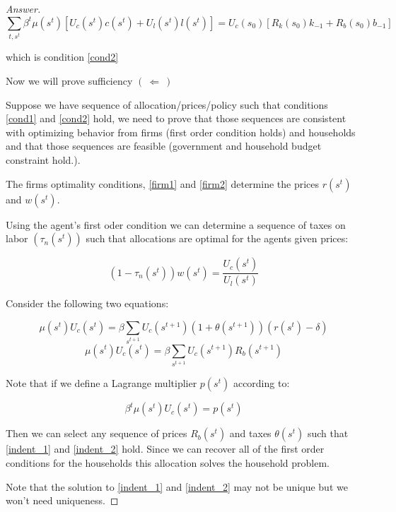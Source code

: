 \documentclass[12pt]{article}
\theoremstyle{definition}
\begin{document}
\begin{proof}[Answer]
$$
\sum_{ {t},  {s}^{ {t}}} \beta^{ {t}} \mu\left( {s}^{ {t}}\right)\left[ {U}_{ {c}}\left( {s}^{ {t}}\right)  {c}\left( {s}^{ {t}}\right)+ {U}_{ {l}}\left( {s}^{ {t}}\right)  {l}\left( {s}^{ {t}}\right)\right]= {U}_{ {c}}\left( {s}_{0}\right)\left[ {R}_{ {k}}\left( {s}_{0}\right)  {k}_{-1}+ {R}_{ {b}}\left( {s}_{0}\right)  {b}_{-1}\right]
$$

which is condition \eqref{cond2} 

Now we will prove sufficiency $(\:\Longleftarrow\:)$

Suppose we have sequence of allocation/prices/policy such that conditions \eqref{cond1} and \eqref{cond2} hold, we need to prove that those sequences are consistent with optimizing behavior from firms (first order condition holds) and households and that those sequences are feasible (government and household budget constraint hold.).

The firms optimality conditions, \eqref{firm1} and \eqref{firm2} determine the prices $r(s^t)$ and $w(s^t)$.

Using the agent's first oder condition we can determine a sequence of taxes on labor $\left(\tau_{n}(s^t)\right)$ such that allocations are optimal for the agents given prices:

$$\left(1-\tau_{n}(s^t)\right )w(s^t) = \frac{U_c(s^t)}{U_l(s^t)}$$

Consider the following two equations:

\begin{equation}\label{indent_1}
    \mu(s^t)U_c(s^t)=\beta\sum_{s^{t+1}}U_c(s^{t+1})(1+\theta(s^{t+1}))(r(s^{t})-\delta)
\end{equation}
\begin{equation}\label{indent_2}
    \mu(s^t)U_c(s^t)=\beta\sum_{s^{t+1}}U_c(s^{t+1})R_b(s^{t+1})
\end{equation}

Note that if we define a Lagrange multiplier $p(s^t)$ according to:

$$\beta^{t} \mu\left(s^{t}\right) U_{c}\left(s^{t}\right)=p\left(s^{t}\right)$$

Then we can select any sequence of prices $R_b(s^t)$ and taxes $\theta(s^t)$ such that \eqref{indent_1} and \eqref{indent_2} hold. Since we can recover all of the first order conditions for the households this allocation solves the household problem. 

Note that the solution to \eqref{indent_1} and \eqref{indent_2} may not be unique but we won't need uniqueness.
 

\end{proof}
\end{document}
